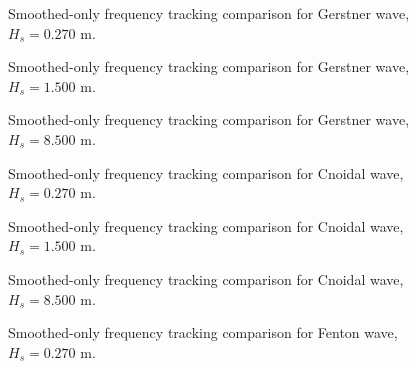 \documentclass[11pt,letterpaper]{article}
\begin{document}
    \begin{figure}[H]\centering
    \resizebox{\textwidth}{!}{}
    \caption{Smoothed-only frequency tracking comparison for Gerstner wave, $H_s = 0.270$ m.}
    \label{fig:freqtrack_gerstner_low_smooth}
    \end{figure}

    \begin{figure}[H]\centering
    \resizebox{\textwidth}{!}{}
    \caption{Smoothed-only frequency tracking comparison for Gerstner wave, $H_s = 1.500$ m.}
    \label{fig:freqtrack_gerstner_medium_smooth}
    \end{figure}

    \begin{figure}[H]\centering
    \resizebox{\textwidth}{!}{}
    \caption{Smoothed-only frequency tracking comparison for Gerstner wave, $H_s = 8.500$ m.}
    \label{fig:freqtrack_gerstner_high_smooth}
    \end{figure}

    \begin{figure}[H]\centering
    \resizebox{\textwidth}{!}{}
    \caption{Smoothed-only frequency tracking comparison for Cnoidal wave, $H_s = 0.270$ m.}
    \label{fig:freqtrack_cnoidal_low_smooth}
    \end{figure}

    \begin{figure}[H]\centering
    \resizebox{\textwidth}{!}{}
    \caption{Smoothed-only frequency tracking comparison for Cnoidal wave, $H_s = 1.500$ m.}
    \label{fig:freqtrack_cnoidal_medium_smooth}
    \end{figure}

    \begin{figure}[H]\centering
    \resizebox{\textwidth}{!}{}
    \caption{Smoothed-only frequency tracking comparison for Cnoidal wave, $H_s = 8.500$ m.}
    \label{fig:freqtrack_cnoidal_high_smooth}
    \end{figure}

    \begin{figure}[H]\centering
    \resizebox{\textwidth}{!}{}
    \caption{Smoothed-only frequency tracking comparison for Fenton wave, $H_s = 0.270$ m.}
    \label{fig:freqtrack_fenton_low_smooth}
    \end{figure}
\end{document}
